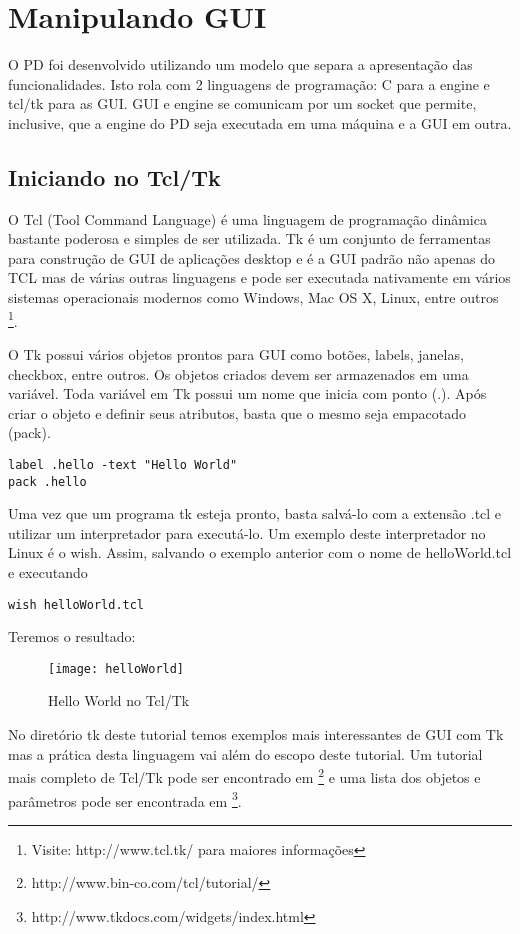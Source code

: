 \chapter{Manipulando GUI}

O PD foi desenvolvido utilizando um modelo que separa a apresentação das
funcionalidades.
Isto rola com 2 linguagens de programação: C para a engine e tcl/tk para as GUI.
GUI e engine se comunicam por um socket que permite, inclusive, que a engine
do PD seja executada em uma máquina e a GUI em outra.

\section{Iniciando no Tcl/Tk}
O Tcl (Tool Command Language) é uma linguagem de programação dinâmica bastante poderosa e simples de ser utilizada. 
Tk é um conjunto de ferramentas para construção de GUI de aplicações desktop e é a GUI padrão não apenas do TCL mas 
de várias outras linguagens e pode ser executada nativamente em vários sistemas operacionais modernos como Windows,
 Mac OS X, Linux, entre outros \footnote{Visite: http://www.tcl.tk/ para maiores informações}.

O Tk possui vários objetos prontos para GUI como botões, labels, janelas, checkbox, entre outros. Os objetos criados
devem ser armazenados em uma variável. Toda variável em Tk possui um nome que inicia com ponto (.). Após criar o objeto
e definir seus atributos, basta que o mesmo seja empacotado (pack).

\begin{lstlisting}
label .hello -text "Hello World"
pack .hello
\end{lstlisting}

Uma vez que um programa tk esteja pronto, basta salvá-lo com a extensão .tcl e utilizar um interpretador para executá-lo.
Um exemplo deste interpretador no Linux é o wish. Assim, salvando o exemplo anterior com o nome de helloWorld.tcl e executando

\begin{lstlisting}
wish helloWorld.tcl
\end{lstlisting}

Teremos o resultado:
\begin{figure}[ht!]
	\centering
	\texttt{[image: helloWorld]}
	\caption{Hello World no Tcl/Tk}
\end{figure}

No diretório tk deste tutorial temos exemplos mais interessantes de GUI com Tk mas a prática desta linguagem
vai além do escopo deste tutorial. Um tutorial mais completo de Tcl/Tk pode ser encontrado em 
\footnote{http://www.bin-co.com/tcl/tutorial/} e uma lista dos objetos e parâmetros pode ser encontrada em
\footnote{http://www.tkdocs.com/widgets/index.html}.


